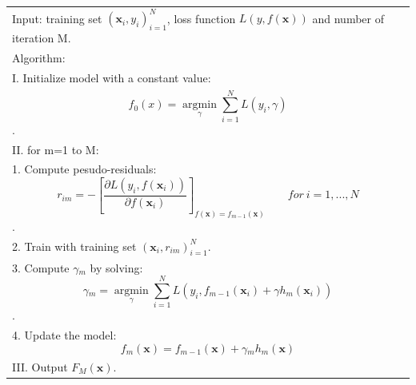 \documentclass[]{article}
\begin{document}
\begin{longtable}[c]{@{}l@{}}
\toprule
\begin{minipage}[t]{0.97\columnwidth}\raggedright\strut
Input: training set \({(\textbf{x}_{i},y_{i})}_{i=1}^N\), loss function
\(L(y,f(\textbf{x}))\) and number of iteration M.
\strut\end{minipage}\tabularnewline
\begin{minipage}[t]{0.97\columnwidth}\raggedright\strut
Algorithm:
\strut\end{minipage}\tabularnewline
\begin{minipage}[t]{0.97\columnwidth}\raggedright\strut
I. Initialize model with a constant value:
\strut\end{minipage}\tabularnewline
\begin{minipage}[t]{0.97\columnwidth}\raggedright\strut
\[f_{0}(x)=\mathop{\arg\min}\limits_{\gamma}\sum_{i=1}^NL(y_i,\gamma)\].
\strut\end{minipage}\tabularnewline
\begin{minipage}[t]{0.97\columnwidth}\raggedright\strut
II. for m=1 to M:
\strut\end{minipage}\tabularnewline
\begin{minipage}[t]{0.97\columnwidth}\raggedright\strut
1. Compute pesudo-residuals:
\[r_{im}=-[\frac{\partial{L(y_i,f(\textbf{x}_i))}}{\partial{f(\textbf{x}_i)}}]_{f(\textbf{x})=f_{m-1}(\textbf{x})} \qquad  for\ i=1,...,N\].
\strut\end{minipage}\tabularnewline
\begin{minipage}[t]{0.97\columnwidth}\raggedright\strut
2. Train with training set \({(\textbf{x}_i,r_{im})}_{i=1}^N\).
\strut\end{minipage}\tabularnewline
\begin{minipage}[t]{0.97\columnwidth}\raggedright\strut
3. Compute \(\gamma{_m}\) by solving:
\[\gamma{_m}=\mathop{\arg\min}\limits_{\gamma}\sum_{i=1}^NL(y_i,f_{m-1}(\textbf{x}_i)+\gamma{h_m(\textbf{x}_i)})\].
\strut\end{minipage}\tabularnewline
\begin{minipage}[t]{0.97\columnwidth}\raggedright\strut
4. Update the model:
\[f_m(\textbf{x})=f_{m-1}(\textbf{x})+\gamma{_m}h_m(\textbf{x})\]
\strut\end{minipage}\tabularnewline
\begin{minipage}[t]{0.97\columnwidth}\raggedright\strut
III. Output \(F_M(\textbf{x})\).
\strut\end{minipage}\tabularnewline
\bottomrule
\end{longtable}
\end{document}
